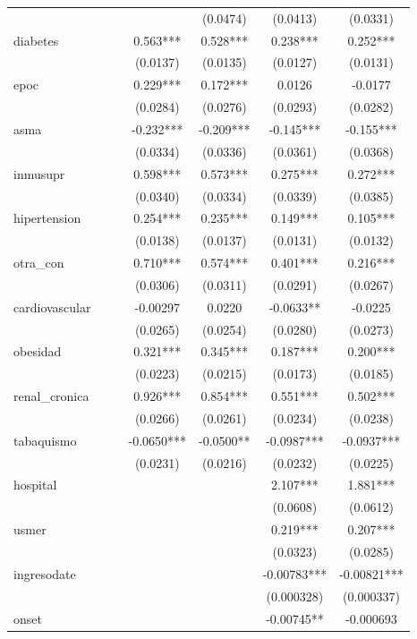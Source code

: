 \documentclass[]{article}
\begin{document}
\begin{tabular}{lcccccc}
 &  &  &  & (0.0474) & (0.0413) & (0.0331) \\
diabetes &  &  & 0.563*** & 0.528*** & 0.238*** & 0.252*** \\
 &  &  & (0.0137) & (0.0135) & (0.0127) & (0.0131) \\
epoc &  &  & 0.229*** & 0.172*** & 0.0126 & -0.0177 \\
 &  &  & (0.0284) & (0.0276) & (0.0293) & (0.0282) \\
asma &  &  & -0.232*** & -0.209*** & -0.145*** & -0.155*** \\
 &  &  & (0.0334) & (0.0336) & (0.0361) & (0.0368) \\
inmusupr &  &  & 0.598*** & 0.573*** & 0.275*** & 0.272*** \\
 &  &  & (0.0340) & (0.0334) & (0.0339) & (0.0385) \\
hipertension &  &  & 0.254*** & 0.235*** & 0.149*** & 0.105*** \\
 &  &  & (0.0138) & (0.0137) & (0.0131) & (0.0132) \\
otra\_con &  &  & 0.710*** & 0.574*** & 0.401*** & 0.216*** \\
 &  &  & (0.0306) & (0.0311) & (0.0291) & (0.0267) \\
cardiovascular &  &  & -0.00297 & 0.0220 & -0.0633** & -0.0225 \\
 &  &  & (0.0265) & (0.0254) & (0.0280) & (0.0273) \\
obesidad &  &  & 0.321*** & 0.345*** & 0.187*** & 0.200*** \\
 &  &  & (0.0223) & (0.0215) & (0.0173) & (0.0185) \\
renal\_cronica &  &  & 0.926*** & 0.854*** & 0.551*** & 0.502*** \\
 &  &  & (0.0266) & (0.0261) & (0.0234) & (0.0238) \\
tabaquismo &  &  & -0.0650*** & -0.0500** & -0.0987*** & -0.0937*** \\
 &  &  & (0.0231) & (0.0216) & (0.0232) & (0.0225) \\
hospital &  &  &  &  & 2.107*** & 1.881*** \\
 &  &  &  &  & (0.0608) & (0.0612) \\
usmer &  &  &  &  & 0.219*** & 0.207*** \\
 &  &  &  &  & (0.0323) & (0.0285) \\
ingresodate &  &  &  &  & -0.00783*** & -0.00821*** \\
 &  &  &  &  & (0.000328) & (0.000337) \\
onset &  &  &  &  & -0.00745** & -0.000693 \\

\end{tabular}
\end{document}
